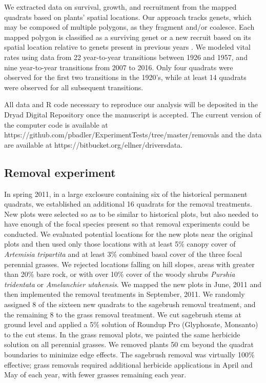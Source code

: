 \documentclass[11pt]{article}
\begin{document}
\begin{doublespacing}
We extracted data on survival, growth, and recruitment from the mapped quadrats based on plants' spatial locations. Our approach tracks genets, which may be composed of multiple polygons, as they fragment and/or coalesce. Each mapped polygon is classified as a surviving genet or a new recruit based on its spatial location relative to genets present in previous years \citep{lauenroth_demography_2008}. We modeled vital rates using data from 22 year-to-year transitions between 1926 and 1957, and nine year-to-year transitions from 2007 to 2016. Only four quadrats were observed for the first two transitions in the 1920's, while at least 14 quadrats were observed for all subsequent transitions. 

All data and R code necessary to reproduce our analysis will be deposited in the Dryad Digital Repository once the manuscript is accepted. The current version of the computer code is available at https://github.com/pbadler/ExperimentTests/tree/master/removals and the data are available at https://bitbucket.org/ellner/driversdata. 

\subsection*{Removal experiment}
In spring 2011, in a large exclosure containing six of the historical permanent quadrats, we established an additional 16 quadrats for the removal treatments. New plots were selected so as to be similar to historical plots, but also needed to have enough of the focal species present so that removal experiments could be conducted. We evaluated potential locations for the new plots near the original plots and then used only those locations with at least 5\% canopy cover of \textit{Artemisia tripartita} and at least 3\% combined basal cover of the three focal perennial grasses. We rejected locations falling on hill slopes, areas with greater than 20\% bare rock, or with over 10\% cover of the woody shrubs \textit{Purshia tridentata} or \textit{Amelanchier utahensis}. We mapped the new plots in June, 2011 and then implemented the removal treatments in September, 2011. We randomly assigned 8 of the sixteen new quadrats to the sagebrush removal treatment, and the remaining 8 to the grass removal treatment. We cut sagebrush stems at ground level and applied a 5\% solution of Roundup Pro (Glyphosate, Monsanto) to the cut stems. In the grass removal plots, we painted the same herbicide solution on all perennial grasses. We removed plants 50 cm beyond the quadrat boundaries to minimize edge effects. The sagebrush removal was virtually 100\% effective; grass removals required additional herbicide applications in April and May of each year, with fewer grasses remaining each year.


\end{doublespacing}
\end{document}
